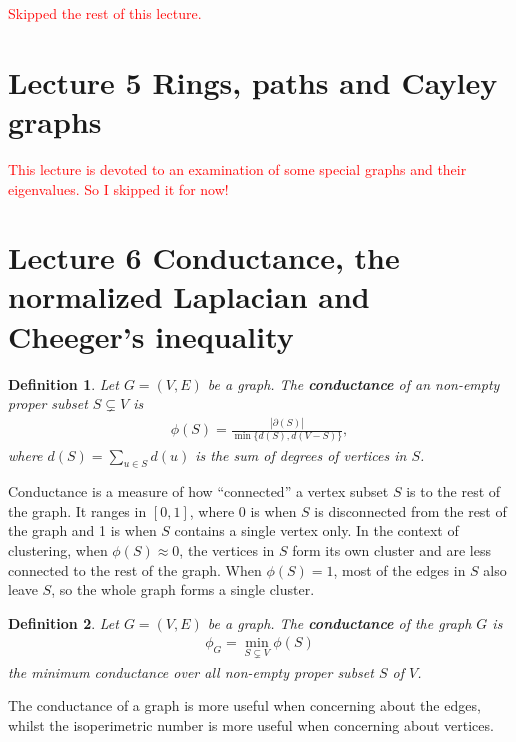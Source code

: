 \documentclass[]{article}
\newtheorem{definition}{Definition}[section] %
\begin{document}
	\textcolor{red}{Skipped the rest of this lecture.}
	
	
	\section{Lecture 5 Rings, paths and Cayley graphs}
	\textcolor{red}{This lecture is devoted to an examination of some special graphs and their eigenvalues. So I skipped it for now!}
	
	\section{Lecture 6 Conductance, the normalized Laplacian and Cheeger's inequality}
	
	
	\begin{definition}
		Let $G=(V,E)$ be a graph. The \textbf{conductance} of an non-empty proper subset $S \subsetneq V$ is 
		\begin{align*}
		\phi(S) = \frac{|\partial(S)|}{\min\{d(S), d(V-S)\}},
		\end{align*}
		where $d(S) = \sum_{u \in S} d(u)$ is the sum of degrees of vertices in $S$.
	\end{definition}
	Conductance is a measure of how ``connected'' a vertex subset $S$ is to the rest of the graph. It ranges in $[0,1]$, where 0 is when $S$ is disconnected from the rest of the graph and 1 is when $S$ contains a single vertex only. In the context of clustering, when $\phi(S)\approx 0$, the vertices in $S$ form its own cluster and are less connected to the rest of the graph. When $\phi(S)=1$, most of the edges in $S$ also leave $S$, so the whole graph forms a single cluster. 
	
	\begin{definition}
		Let $G=(V,E)$ be a graph. The \textbf{conductance} of the graph $G$ is 
		\begin{align*}
		\phi_G = \min_{S \subsetneq V} \phi(S)
		\end{align*}
		the minimum conductance over all non-empty proper subset $S$ of $V$. 
	\end{definition}
	
	
	The conductance of a graph is more useful when concerning about the edges, whilst the isoperimetric number is more useful when concerning about vertices. 
	
\end{document}
